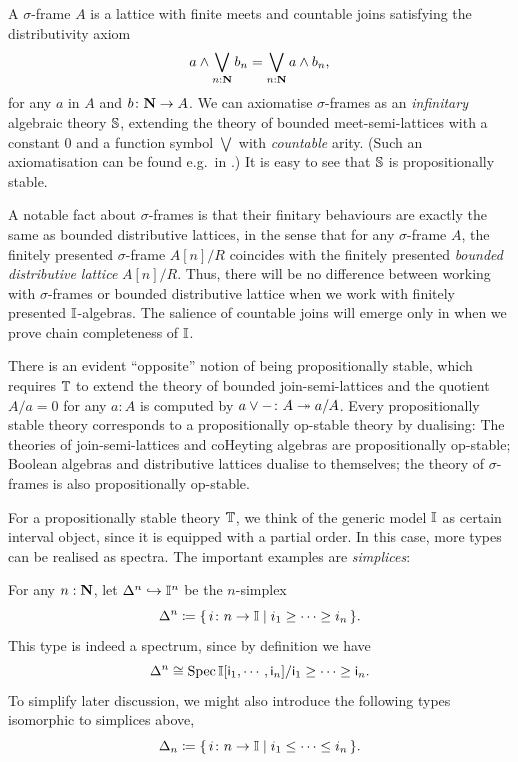 \begin{remark}\label{rem:sigmaframe}
  A $\sigma$-frame $A$ is a lattice with finite meets and countable joins satisfying the distributivity axiom 
  \[ a \wedge \bigvee_{n:\N} b_n = \bigvee_{n:\N} a \wedge b_n\text{,} \]
  for any $a$ in $A$ and $b \colon \mathbf{N} \to A$. We can axiomatise $\sigma$-frames as an \emph{infinitary} algebraic theory $\mathbb{S}$, extending the theory of bounded meet-semi-lattices with a constant $0$ and a function symbol $\bigvee$ with \emph{countable} arity. (Such an axiomatisation can be found e.g.\ in \citet[Exa.~3.26]{adamek1994locally}.) It is easy to see that $\mathbb{S}$ is propositionally stable. 

  A notable fact about $\sigma$-frames is that their finitary behaviours are exactly the same as bounded distributive lattices, in the sense that for any $\sigma$-frame $A$, the finitely presented $\sigma$-frame $A[n]/R$ coincides with the finitely presented \emph{bounded distributive lattice} $A[n]/R$. Thus, there will be no difference between working with $\sigma$-frames or bounded distributive lattice when we work with finitely presented $\mathbb{I}$-algebras. The salience of countable joins will emerge only in  when we prove chain completeness of $\mathbb{I}$.
\end{remark}

\begin{remark}\label{rem:opprop}
  There is an evident ``opposite'' notion of being propositionally stable, which requires $\mathbb{T}$ to extend the theory of bounded join-semi-lattices and the quotient $A/a = 0$ for any $a:A$ is computed by ${a \vee -} \colon A \twoheadrightarrow a/A$. Every propositionally stable theory corresponds to a propositionally op-stable theory by dualising: The theories of join-semi-lattices and coHeyting algebras are propositionally op-stable; Boolean algebras and distributive lattices dualise to themselves; the theory of $\sigma$-frames is also propositionally op-stable.
\end{remark}

For a propositionally stable theory $\mathbb{T}$, we think of the generic model $\mathbb{I}$ as certain interval object, since it is equipped with a partial order. In this case, more types can be realised as spectra. The important examples are \emph{simplices}:

\begin{example}\label{exm:simplicessober}
  For any $n : \mathbf{N}$, let $\Delta^n \hookrightarrow \mathbb{I}^n$ be the $n$-simplex
  \[ \Delta^n \coloneq \scomp{i \colon n \to \I}{i_1 \ge \cdots \ge i_n}\text{.} \]
  This type is indeed a spectrum, since by definition we have
  \[ \Delta^n \cong \spec\I[\ms{i}_1,\cdots,\ms{i}_n]/\ms{i}_1\ge\cdots\ge \ms{i}_n\text{.} \]
  To simplify later discussion, we might also introduce the following types isomorphic to simplices above,
  \[ \Delta_n \coloneq \scomp{i \colon n \to \I}{i_1 \le \cdots \le i_n}\text{.} \]
\end{example}

